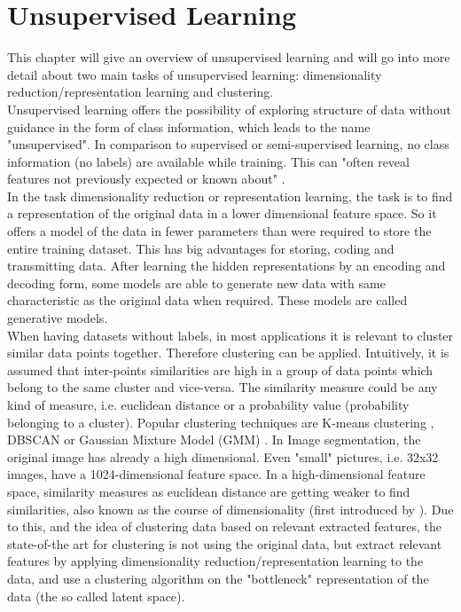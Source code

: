 \documentclass[12pt,DIV14,BCOR12mm,a4paper,footexclude,headinclude,halfparskip-,twoside,openright,openany,cleardoubleempty,idxtotoc,bibtotoc]{scrreprt} %
\numberwithin{equation}{chapter}
\begin{document}
\section{Unsupervised Learning}
This chapter will give an overview of unsupervised learning and will go into more detail about two main tasks of unsupervised learning: dimensionality reduction/representation learning and clustering.\\
Unsupervised learning offers the possibility of exploring structure of data without guidance in the form of class information, which leads to the name "unsupervised". In comparison to supervised or semi-supervised learning, no class information (no labels) are available while training. This can "often reveal features not previously expected or known about" \cite{Michie-et-al-1994}.\\
In the task dimensionality reduction or representation learning, the task is to find a representation of the original data in a lower dimensional feature space. So it offers a model of the data in fewer parameters than were required to store the entire training dataset. This has big advantages for storing, coding and transmitting data. After learning the hidden representations by an encoding and decoding form, some models are able to generate new data with same characteristic as the original data when required. These models are called generative models.\\
When having datasets without labels, in most applications it is relevant to cluster similar data points together. Therefore clustering can be applied. Intuitively, it is assumed that inter-points similarities are high in a group of data points which belong to the same cluster and vice-versa. The similarity measure could be any kind of measure, i.e. euclidean distance or a probability value (probability belonging to a cluster). Popular clustering techniques are K-means clustering \cite{Lloyd82leastsquares}, DBSCAN \cite{Ester96adensity-based} or Gaussian Mixture Model (GMM) \cite{Gilles07MixtureModelsforClassification}. In Image segmentation, the original image has already a high dimensional. Even "small" pictures, i.e. 32x32 images, have a 1024-dimensional feature space. In a high-dimensional feature space, similarity measures as euclidean distance are getting weaker to find similarities, also known as the course of dimensionality (first introduced by \cite{Bellman34}). Due to this, and the idea of clustering data based on relevant extracted features, the state-of-the art for clustering is not using the original data, but extract relevant features by applying dimensionality reduction/representation learning to the data, and use a clustering algorithm on the "bottleneck" representation of the data (the so called latent space).
\end{document}
